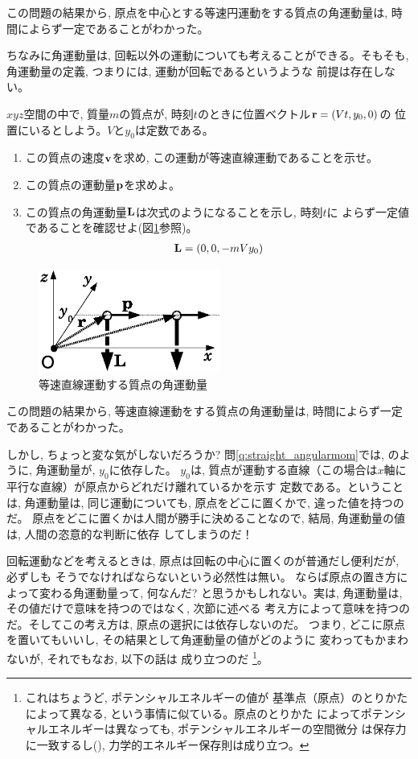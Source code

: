 この問題の結果から, 原点を中心とする等速円運動をする質点の角運動量は, 
時間によらず一定であることがわかった。

ちなみに角運動量は, 回転以外の運動についても考えることができる。そもそも, 
角運動量の定義, つまりには, 運動が回転であるというような
前提は存在しない。\mv

%
\begin{q}\label{q:straight_angularmom}
$xyz$空間の中で, 質量$m$の質点が, 時刻$t$のときに位置ベクトル${\bf r}=(Vt, y_0, 0)$の
位置にいるとしよう。$V$と$y_0$は定数である。
\begin{enumerate}
\item この質点の速度${\bf v}$を求め, この運動が等速直線運動であることを示せ。
\item この質点の運動量${\bf p}$を求めよ。
\item この質点の角運動量${\bf L}$は次式のようになることを示し, 時刻$t$に
よらず一定値であることを確認せよ(図\ref{fig:angular_mom_lin}参照)。
\begin{eqnarray}
{\bf L}=(0, 0, -mVy_0)\label{eq:straight_angularmom}
\end{eqnarray}
\end{enumerate}
\begin{figure}[h]
    \centering
    \includegraphics[width=6cm]{angular_mom_lin.eps}
    \caption{等速直線運動する質点の角運動量}\label{fig:angular_mom_lin}
\end{figure}
\end{q}

この問題の結果から, 等速直線運動をする質点の角運動量は, 時間によらず一定
であることがわかった。

しかし, ちょっと変な気がしないだろうか? 問\ref{q:straight_angularmom}では, 
のように, 角運動量が, $y_0$に依存した。
$y_0$は, 質点が運動する直線（この場合は$x$軸に平行な直線）が原点からどれだけ離れているかを示す
定数である。ということは, 角運動量は, 同じ運動についても, 原点をどこに置くかで, 違った値を持つのだ。
原点をどこに置くかは人間が勝手に決めることなので, 結局, 角運動量の値は, 人間の恣意的な判断に依存
してしまうのだ！

回転運動などを考えるときは, 原点は回転の中心に置くのが普通だし便利だが, 必ずしも
そうでなければならないという必然性は無い。
ならば原点の置き方によって変わる角運動量って, 何なんだ? 
と思うかもしれない。実は, 角運動量は, その値だけで意味を持つのではなく, 次節に述べる
考え方によって意味を持つのだ。そしてこの考え方は, 原点の選択には依存しないのだ。
つまり, どこに原点を置いてもいいし, その結果として角運動量の値がどのように
変わってもかまわないが, それでもなお, 以下の話は
成り立つのだ
\footnote{これはちょうど, ポテンシャルエネルギーの値が
基準点（原点）のとりかたによって異なる, という事情に似ている。原点のとりかた
によってポテンシャルエネルギーは異なっても, ポテンシャルエネルギーの空間微分
は保存力に一致するし(), 力学的エネルギー保存則は成り立つ。}。
\hv



